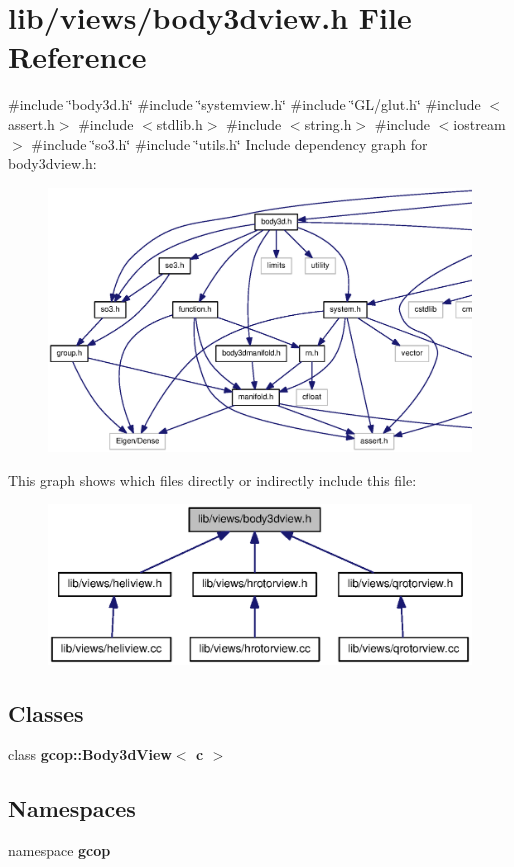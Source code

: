 \section{lib/views/body3dview.h \-File \-Reference}
\label{body3dview_8h}
{\ttfamily \#include \char`\"{}body3d.\-h\char`\"{}}\*
{\ttfamily \#include \char`\"{}systemview.\-h\char`\"{}}\*
{\ttfamily \#include \char`\"{}\-G\-L/glut.\-h\char`\"{}}\*
{\ttfamily \#include $<$assert.\-h$>$}\*
{\ttfamily \#include $<$stdlib.\-h$>$}\*
{\ttfamily \#include $<$string.\-h$>$}\*
{\ttfamily \#include $<$iostream$>$}\*
{\ttfamily \#include \char`\"{}so3.\-h\char`\"{}}\*
{\ttfamily \#include \char`\"{}utils.\-h\char`\"{}}\*
\-Include dependency graph for body3dview.\-h\-:\nopagebreak
\begin{figure}[H]
\begin{center}
\leavevmode
\includegraphics[width=350pt]{body3dview_8h__incl}
\end{center}
\end{figure}
\-This graph shows which files directly or indirectly include this file\-:\nopagebreak
\begin{figure}[H]
\begin{center}
\leavevmode
\includegraphics[width=350pt]{body3dview_8h__dep__incl}
\end{center}
\end{figure}
\subsection*{\-Classes}
\begin{DoxyCompactItemize}
\item 
class {\bf gcop\-::\-Body3d\-View$<$ c $>$}
\end{DoxyCompactItemize}
\subsection*{\-Namespaces}
\begin{DoxyCompactItemize}
\item 
namespace {\bf gcop}
\end{DoxyCompactItemize}
